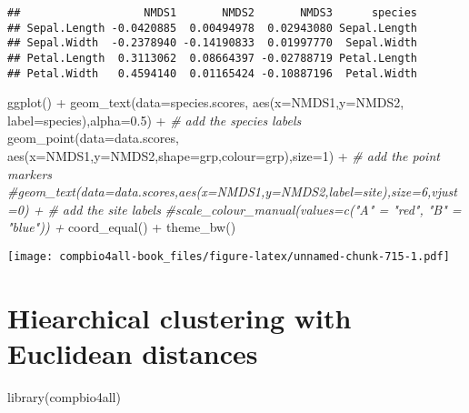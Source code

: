 \documentclass[
]{book}
\newenvironment{Shaded}{\begin{snugshade}}{\end{snugshade}}
\newcommand{\AttributeTok}[1]{\textcolor[rgb]{0.77,0.63,0.00}{#1}}
\newcommand{\CommentTok}[1]{\textcolor[rgb]{0.56,0.35,0.01}{\textit{#1}}}
\newcommand{\DecValTok}[1]{\textcolor[rgb]{0.00,0.00,0.81}{#1}}
\newcommand{\FloatTok}[1]{\textcolor[rgb]{0.00,0.00,0.81}{#1}}
\newcommand{\FunctionTok}[1]{\textcolor[rgb]{0.00,0.00,0.00}{#1}}
\newcommand{\NormalTok}[1]{#1}
\newcommand{\SpecialCharTok}[1]{\textcolor[rgb]{0.00,0.00,0.00}{#1}}
\begin{document}
\begin{verbatim}
##                   NMDS1       NMDS2       NMDS3      species
## Sepal.Length -0.0420885  0.00494978  0.02943080 Sepal.Length
## Sepal.Width  -0.2378940 -0.14190833  0.01997770  Sepal.Width
## Petal.Length  0.3113062  0.08664397 -0.02788719 Petal.Length
## Petal.Width   0.4594140  0.01165424 -0.10887196  Petal.Width
\end{verbatim}

\begin{Shaded}
\begin{Highlighting}[]
\FunctionTok{ggplot}\NormalTok{() }\SpecialCharTok{+} 
  \FunctionTok{geom\_text}\NormalTok{(}\AttributeTok{data=}\NormalTok{species.scores,}
            \FunctionTok{aes}\NormalTok{(}\AttributeTok{x=}\NormalTok{NMDS1,}\AttributeTok{y=}\NormalTok{NMDS2,}
                \AttributeTok{label=}\NormalTok{species),}\AttributeTok{alpha=}\FloatTok{0.5}\NormalTok{) }\SpecialCharTok{+}  \CommentTok{\# add the species labels}
  \FunctionTok{geom\_point}\NormalTok{(}\AttributeTok{data=}\NormalTok{data.scores,}
             \FunctionTok{aes}\NormalTok{(}\AttributeTok{x=}\NormalTok{NMDS1,}\AttributeTok{y=}\NormalTok{NMDS2,}\AttributeTok{shape=}\NormalTok{grp,}\AttributeTok{colour=}\NormalTok{grp),}\AttributeTok{size=}\DecValTok{1}\NormalTok{) }\SpecialCharTok{+} \CommentTok{\# add the point markers}
  \CommentTok{\#geom\_text(data=data.scores,aes(x=NMDS1,y=NMDS2,label=site),size=6,vjust=0) +  \# add the site labels}
  \CommentTok{\#scale\_colour\_manual(values=c("A" = "red", "B" = "blue")) +}
  \FunctionTok{coord\_equal}\NormalTok{() }\SpecialCharTok{+}
  \FunctionTok{theme\_bw}\NormalTok{()}
\end{Highlighting}
\end{Shaded}

\texttt{[image: compbio4all-book\_files/figure-latex/unnamed-chunk-715-1.pdf]}

\hypertarget{hiearchical-clustering-with-euclidean-distances}{%
\chapter{Hiearchical clustering with Euclidean distances}\label{hiearchical-clustering-with-euclidean-distances}}

\begin{Shaded}
\begin{Highlighting}[]
\FunctionTok{library}\NormalTok{(compbio4all)}
\end{Highlighting}
\end{Shaded}
\end{document}
